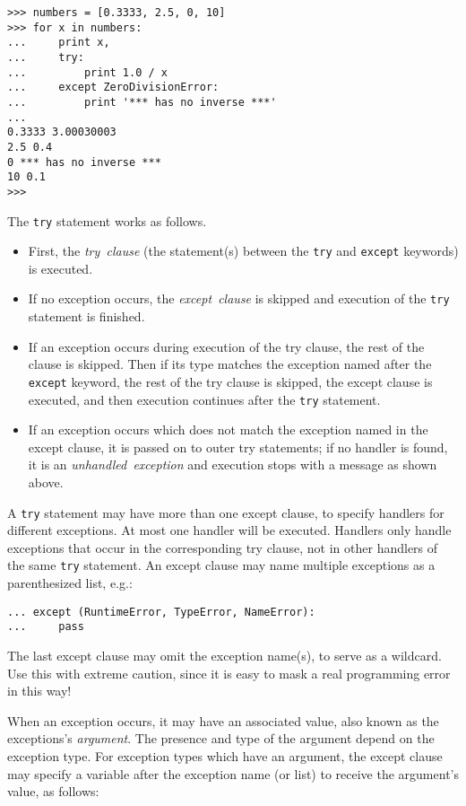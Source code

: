 \bcode\begin{verbatim}
>>> numbers = [0.3333, 2.5, 0, 10]
>>> for x in numbers:
...     print x,
...     try:
...         print 1.0 / x
...     except ZeroDivisionError:
...         print '*** has no inverse ***'
... 
0.3333 3.00030003
2.5 0.4
0 *** has no inverse ***
10 0.1
>>> 
\end{verbatim}\ecode
%
The {\tt try} statement works as follows.
\begin{itemize}
\item
First, the
{\em try\ clause}
(the statement(s) between the {\tt try} and {\tt except} keywords) is
executed.
\item
If no exception occurs, the
{\em except\ clause}
is skipped and execution of the {\tt try} statement is finished.
\item
If an exception occurs during execution of the try clause,
the rest of the clause is skipped.  Then if
its type matches the exception named after the {\tt except} keyword,
the rest of the try clause is skipped, the except clause is executed,
and then execution continues after the {\tt try} statement.
\item
If an exception occurs which does not match the exception named in the
except clause, it is passed on to outer try statements; if no handler is
found, it is an
{\em unhandled\ exception}
and execution stops with a message as shown above.
\end{itemize}
A {\tt try} statement may have more than one except clause, to specify
handlers for different exceptions.
At most one handler will be executed.
Handlers only handle exceptions that occur in the corresponding try
clause, not in other handlers of the same {\tt try} statement.
An except clause may name multiple exceptions as a parenthesized list,
e.g.:

\bcode\begin{verbatim}
... except (RuntimeError, TypeError, NameError):
...     pass
\end{verbatim}\ecode
%
The last except clause may omit the exception name(s), to serve as a
wildcard.
Use this with extreme caution, since it is easy to mask a real
programming error in this way!

When an exception occurs, it may have an associated value, also known as
the exceptions's
{\em argument}.
The presence and type of the argument depend on the exception type.
For exception types which have an argument, the except clause may
specify a variable after the exception name (or list) to receive the
argument's value, as follows:

